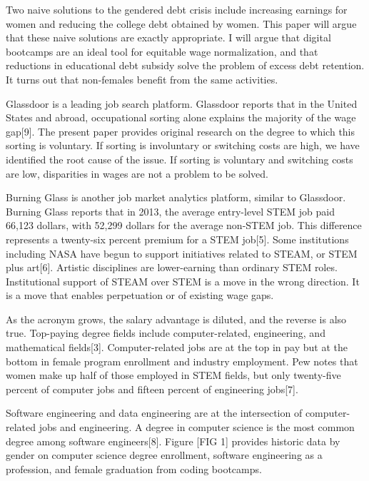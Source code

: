 \documentclass[review]{elsarticle}
\begin{document}
Two naive solutions to the gendered debt crisis include
increasing earnings for women
and reducing the college debt obtained by women.
This paper will argue that these naive solutions are exactly appropriate.
I will argue that digital bootcamps are an ideal tool for equitable wage normalization,
and that reductions in educational debt subsidy solve the problem of excess debt retention.
It turns out that non-females benefit from the same activities.

Glassdoor is a leading job search platform.
Glassdoor reports that in the United States and abroad, occupational sorting alone explains the majority of the wage gap[9].
The present paper provides original research on the degree to which this sorting is voluntary.
If sorting is involuntary or switching costs are high, we have identified the root cause of the issue.
If sorting is voluntary and switching costs are low, disparities in wages are not a problem to be solved.

Burning Glass is another job market analytics platform, similar to Glassdoor.
Burning Glass reports that in 2013,
the average entry-level STEM job paid 66,123 dollars,
with 52,299 dollars for the average non-STEM job.
This difference represents a twenty-six percent premium for a STEM job[5].
Some institutions including NASA have begun to support initiatives related to STEAM, or STEM plus art[6].
Artistic disciplines are lower-earning than ordinary STEM roles.
Institutional support of STEAM over STEM is a move in the wrong direction.
It is a move that enables perpetuation or  of existing wage gaps.

As the acronym grows, the salary advantage is diluted, and the reverse is also true.
Top-paying degree fields include computer-related, engineering, and mathematical fields[3].
Computer-related jobs are at the top in pay but at the bottom in female program enrollment and industry employment.
Pew notes that women make up half of those employed in STEM fields,
but only twenty-five percent of computer jobs
and fifteen percent of engineering jobs[7].

Software engineering and data engineering are at the intersection of computer-related jobs and engineering.
A degree in computer science is the most common degree among software engineers[8].
Figure [FIG 1] provides historic data by gender on computer science degree enrollment,
software engineering as a profession,
and female graduation from coding bootcamps.
\end{document}

